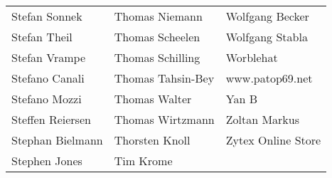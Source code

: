 \begin{tabular}{p{4.5cm}p{4.5cm}p{4.5cm}}
Stefan Sonnek & Thomas Niemann & Wolfgang Becker \\
Stefan Theil & Thomas Scheelen & Wolfgang Stabla \\
Stefan Vrampe & Thomas Schilling & Worblehat \\
Stefano Canali & Thomas Tahsin-Bey & www.patop69.net \\
Stefano Mozzi & Thomas Walter & Yan B \\
Steffen Reiersen & Thomas Wirtzmann & Zoltan Markus \\
Stephan Bielmann & Thorsten Knoll & Zytex Online Store \\
Stephen Jones & Tim Krome &         \\
\end{tabular}

